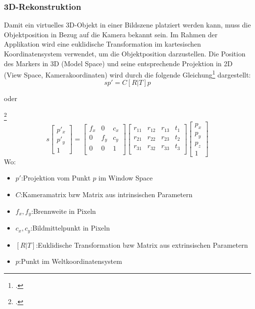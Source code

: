 \subsubsection{3D-Rekonstruktion}\label{sssec2drekonstruktion}
Damit ein virtuelles 3D-Objekt in einer Bildszene platziert werden kann, muss die Objektposition in Bezug auf die Kamera bekannt sein. Im Rahmen der Applikation wird eine euklidische Transformation im kartesischen Koordinatensystem verwendet, um die Objektposition darzustellen. Die Position des Markers in 3D (Model Space) und seine entsprechende Projektion in 2D (View Space, Kamerakoordinaten) wird durch die folgende Gleichung\footcite[Vgl.][\ac{S} 76]{Baggio2012} dargestellt:
\Large $$sp' = C[R|T]p$$
\normalsize
\centerline{oder}\footcite{opencv3DReconstruction}
\begin{equation*}
s
\begin{bmatrix}
p'_{x}\\
p'_{y}\\
1
\end{bmatrix}
=
\begin{bmatrix}
f_{x} & 0 & c_{x}\\
0 & f_{y} & c_{y}\\
0 & 0 & 1\\
\end{bmatrix}
\begin{bmatrix}
r_{11} & r_{12} & r_{13} & t_{1}\\
r_{21} & r_{22} & r_{23} & t_{2}\\
r_{31} & r_{32} & r_{33} & t_{3}\\
\end{bmatrix}
\begin{bmatrix}
p_{x}\\
p_{y}\\
p_{z}\\
1
\end{bmatrix}
\end{equation*}
Wo:
\begin{itemize}[label=]
    \item $p'$:\hspace{1.1cm}Projektion vom Punkt $p$ im Window Space
    \item $C$:\hspace{1.1cm}Kameramatrix \acs{bzw} Matrix aus intrinsischen Parametern
    \item $f_{x}, f_{y}$:\hspace{0.5cm}Brennweite in Pixeln
    \item $c_{x}, c_{y}$:\hspace{0.5cm}Bildmittelpunkt in Pixeln
    \item $[R|T]$:\hspace{0.5cm}Euklidische Transformation \acs{bzw} Matrix aus extrinsischen Parametern
    \item $p$:\hspace{1.2cm}Punkt im Weltkoordinatensystem
\end{itemize}

